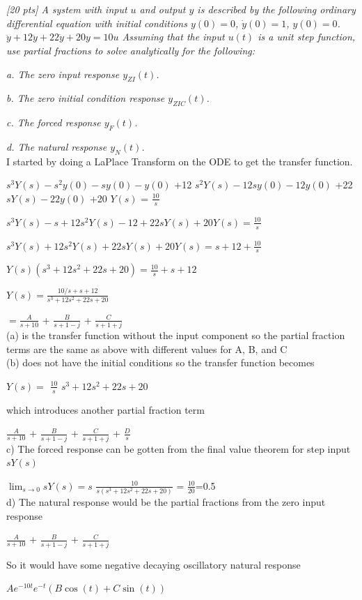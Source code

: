 \documentclass{article}
\begin{document}
\section{}

\textit{[20 pts] A system with input $u$ and output $y$ is described by the following ordinary differential equation with initial conditions $y(0) = 0$, $\dot{y}(0) = 1$, $y(0) = 0$. $\ddot{y} + 12\ddot{y} + 22\dot{y} + 20y = 10u$ Assuming that the input $u(t)$ is a unit step function, use partial fractions to solve analytically for the following:}

\textit{a. The zero input response $y_{ZI}(t)$.}

\textit{b. The zero initial condition response $y_{ZIC}(t)$.}

\textit{c. The forced response $y_F(t)$.} 

\textit{d. The natural response $y_N(t)$.} \\

I started by doing a LaPlace Transform on the ODE to get the transfer function.

$s^3Y(s)-s^2y(0)-sy(0)-y(0)$  
+12 $s^2Y(s)-12sy(0)-12y(0)$  
+22 $sY(s)-22y(0)$ +20 $Y(s)$ = $\frac{10}{s}$  

$s^3Y(s)-s+12s^2Y(s)-12+22sY(s)+20Y(s)=\frac{10}{s}$  

$s^3Y(s)+12s^2Y(s)+22sY(s)+20Y(s)=s+12+\frac{10}{s}$  

$Y(s)(s^3+12s^2+22s+20)=\frac{10}{s}+s+12$  

$Y(s)=\frac{10/s+s+12}{s^3+12s^2+22s+20}$

$=\frac{A}{s+10}$ + $\frac{B}{s+1-j}$ + $\frac{C}{s+1+j}$  \\

(a) is the transfer function without the input component so the partial fraction terms are the same as above with different values for A, B, and C \\

(b) does not have the initial conditions so the transfer function becomes  

$Y(s)=$ $\frac{10}{s}$  
$s^3+12s^2+22s+20$  

which introduces another partial fraction term  

$\frac{A}{s+10}$ + $\frac{B}{s+1-j}$ + $\frac{C}{s+1+j}$ + $\frac{D}{s}$  \\

c) The forced response can be gotten from the final value theorem for step input $sY(s)$  

$\lim_{s \to 0} sY(s)=s$ $\frac{10}{s(s^3+12s^2+22s+20)}$ = $\frac{10}{20}$=0.5 \\ 

d) The natural response would be the partial fractions from the zero input response  

$\frac{A}{s+10}$ + $\frac{B}{s+1-j}$ + $\frac{C}{s+1+j}$  

So it would have some negative decaying oscillatory natural response  

$Ae^{-10t}e^{-t} (B \cos(t) + C \sin(t))$
\end{document}
